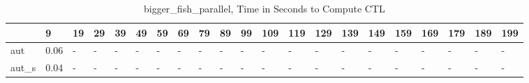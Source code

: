 \begin{table}
\caption{bigger_fish_parallel, Time in Seconds to Compute CTL}
\label{bigger_fish_parallel_CTL_time}
\begin{tabular}{lllllllllllllllllllll}
\toprule
 & 9 & 19 & 29 & 39 & 49 & 59 & 69 & 79 & 89 & 99 & 109 & 119 & 129 & 139 & 149 & 159 & 169 & 179 & 189 & 199 \\
\midrule
aut & 0.06 & - & - & - & - & - & - & - & - & - & - & - & - & - & - & - & - & - & - & - \\
aut_s & 0.04 & - & - & - & - & - & - & - & - & - & - & - & - & - & - & - & - & - & - & - \\
\bottomrule
\end{tabular}
\end{table}
